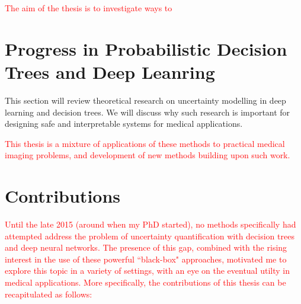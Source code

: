 \textcolor{red}{The aim of the thesis is to investigate ways to } 

 
\section{Progress in Probabilistic Decision Trees and Deep Leanring}
This section will review theoretical research on uncertainty modelling in deep learning and decision trees. We will discuss why such research is important for designing safe and interpretable systems for medical applications. 

\textcolor{red}{This thesis is a mixture of applications of these methods to practical medical imaging problems, and development of new methods building upon such work. }


\section{Contributions} 
\textcolor{red}{Until the late 2015 (around when my PhD started), no methods specifically had attempted address the problem of uncertainty quantification with decision trees and deep neural networks. The presence of this gap, combined with the rising interest in the use of these powerful ``black-box" approaches, motivated me to explore this topic in a variety of settings, with an eye on the eventual utilty in medical applications. More specifically, the contributions of this thesis can be recapitulated as follows:}

